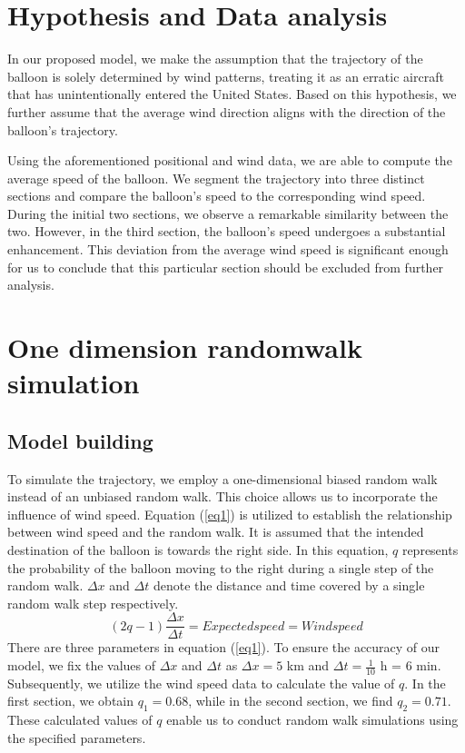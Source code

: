 \documentclass{article}
\begin{document}
\begin{multicols}{2}
\section{Hypothesis and Data analysis}
In our proposed model, we make the assumption that the trajectory of the balloon is solely determined by wind patterns, treating it as an erratic aircraft that has unintentionally entered the United States. Based on this hypothesis, we further assume that the average wind direction aligns with the direction of the balloon's trajectory.\par
\indent\setlength{\parindent}{2em}Using the aforementioned positional and wind data, we are able to compute the average speed of the balloon. We segment the trajectory into three distinct sections and compare the balloon's speed to the corresponding wind speed. During the initial two sections, we observe a remarkable similarity between the two. However, in the third section, the balloon's speed undergoes a substantial enhancement. This deviation from the average wind speed is significant enough for us to conclude that this particular section should be excluded from further analysis.



\section{One dimension randomwalk simulation}
\subsection{Model building}
To simulate the trajectory, we employ a one-dimensional biased random walk instead of an unbiased random walk. This choice allows us to incorporate the influence of wind speed. Equation (\ref{eq1}) is utilized to establish the relationship between wind speed and the random walk. It is assumed that the intended destination of the balloon is towards the right side. In this equation, $q$ represents the probability of the balloon moving to the right during a single step of the random walk. $\Delta x$ and $\Delta t$ denote the distance and time covered by a single random walk step respectively. 
\begin{equation}
(2q-1)\frac{\Delta x}{\Delta t}= Expected speed = Wind speed
\label{eq1}
\end{equation}
\indent\setlength{\parindent}{2em}There are three parameters in equation (\ref{eq1}). To ensure the accuracy of our model, we fix the values of $\Delta x$ and $\Delta t$ as $\Delta x = 5$ km and $\Delta t = \frac{1}{10}$ h = 6 min. Subsequently, we utilize the wind speed data to calculate the value of $q$. In the first section, we obtain $q_1 = 0.68$, while in the second section, we find $q_2 = 0.71$. These calculated values of $q$ enable us to conduct random walk simulations using the specified parameters.\par


\end{multicols}
\end{document}
